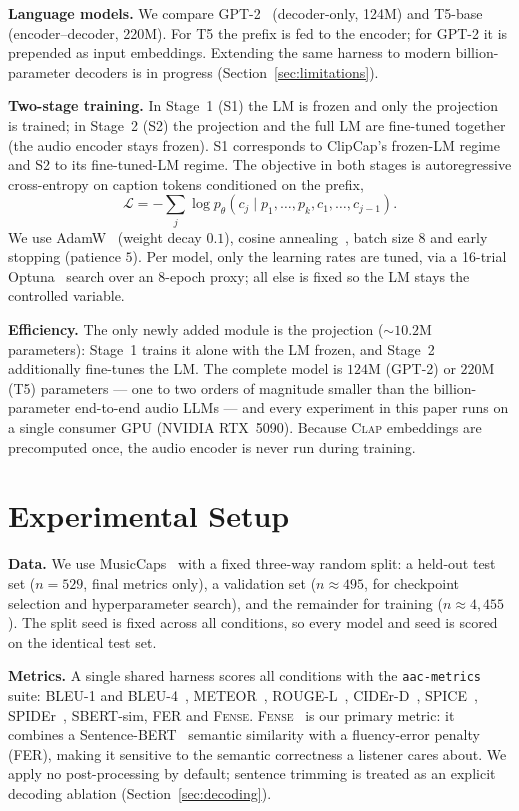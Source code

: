 \documentclass{article}
\newcommand{\fense}{\textsc{Fense}}
\newcommand{\clapenc}{\textsc{Clap}}
\begin{document}
\textbf{Language models.}
We compare GPT-2~\cite{radford2019gpt2} (decoder-only, 124M) and T5-base~\cite{raffel2020t5}
(encoder--decoder, 220M). For T5 the prefix is fed to the encoder; for GPT-2 it is prepended as
input embeddings. Extending the same harness to modern billion-parameter decoders is in progress
(Section~\ref{sec:limitations}).

\textbf{Two-stage training.}
In Stage~1 (S1) the LM is frozen and only the projection is trained; in Stage~2 (S2) the
projection and the full LM are fine-tuned together (the audio encoder stays frozen). S1
corresponds to ClipCap's frozen-LM regime and S2 to its fine-tuned-LM regime. The objective in
both stages is autoregressive cross-entropy on caption tokens conditioned on the prefix,
\[
  \mathcal{L} = -\sum_{j}\log p_\theta\!\left(c_j \mid p_1,\dots,p_k, c_1,\dots,c_{j-1}\right).
\]
We use AdamW~\cite{loshchilov2019adamw} (weight decay $0.1$), cosine
annealing~\cite{loshchilov2017sgdr}, batch size $8$ and early stopping
(patience $5$). Per model, only the learning rates are tuned, via a 16-trial
Optuna~\cite{akiba2019optuna} search over an 8-epoch proxy; all else is fixed so the LM stays
the controlled variable.

\textbf{Efficiency.}
The only newly added module is the projection ($\sim$$10.2$M parameters): Stage~1 trains it
alone with the LM frozen, and Stage~2 additionally fine-tunes the LM. The complete model is
$124$M (GPT-2) or $220$M (T5) parameters --- one to two orders of magnitude smaller than the
billion-parameter end-to-end audio LLMs --- and every experiment in this paper runs on a
single consumer GPU (NVIDIA RTX~5090). Because \clapenc{} embeddings are precomputed once,
the audio encoder is never run during training.

\section{Experimental Setup}\label{sec:setup}

\textbf{Data.}
We use MusicCaps~\cite{agostinelli2023musiclm} with a fixed three-way random split: a held-out
test set ($n{=}529$, final metrics only), a validation set ($n{\approx}495$, for checkpoint
selection and hyperparameter search), and the remainder for training ($n{\approx}4{,}455$). The
split seed is fixed across all conditions, so every model and seed is scored on the identical
test set.

\textbf{Metrics.}
A single shared harness scores all conditions with the \texttt{aac-metrics} suite: BLEU-1 and
BLEU-4~\cite{papineni2002bleu}, METEOR~\cite{banerjee2005meteor}, ROUGE-L~\cite{lin2004rouge},
CIDEr-D~\cite{vedantam2015cider}, SPICE~\cite{anderson2016spice}, SPIDEr~\cite{liu2017spider},
SBERT-sim, FER and \fense{}.
\fense{}~\cite{zhou2022fense} is our primary metric: it combines a
Sentence-BERT~\cite{reimers2019sbert} semantic similarity with a fluency-error penalty (FER),
making it sensitive to the semantic correctness a listener cares about. We apply no post-processing by default; sentence trimming is treated as an
explicit decoding ablation (Section~\ref{sec:decoding}).
\end{document}
